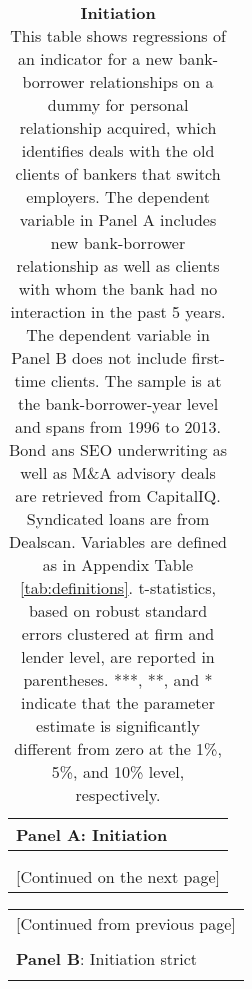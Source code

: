 \begin{table}[H] \begin{center} 
		\caption{\textbf{Initiation} \\ This table shows regressions of an indicator for a new bank-borrower relationships  on a dummy for personal relationship acquired, which identifies deals with the old clients of bankers that switch employers. The dependent variable in Panel A includes new bank-borrower relationship as well as clients with whom the bank had no interaction in the past 5 years. The dependent variable in Panel B does not include first-time clients. The sample is at the bank-borrower-year level and spans from 1996 to 2013. Bond ans SEO underwriting as well as M\&A advisory deals are retrieved from CapitalIQ. Syndicated loans are from Dealscan. Variables are defined as in Appendix Table \ref{tab:definitions}. t-statistics, based on robust standard errors clustered at firm and lender level, are reported in parentheses. ***, **, and * indicate that the parameter estimate is significantly different from zero at the 1\%, 5\%, and 10\% level, respectively. } %
		\label{tab:main_init} 
	\begin{threeparttable} 
		\begin{tabular*}{\hsize}{@{\hskip\tabcolsep\extracolsep\fill}l*{5}{c}}
			\multicolumn{5}{l}{\textbf{Panel A}: Initiation} \\
			\toprule  
				\def\sym#1{\ifmmode^{#1}\else\(^{#1}\)\fi}
				  \\
			\bottomrule \\  \multicolumn{6}{c}{[Continued on the next page]}  \end{tabular*}
			\end{threeparttable}   \end{center} \end{table}
\newpage
		\begin{table}[H] \begin{center} 
		\begin{threeparttable} 
		\begin{tabular*}{\hsize}{@{\hskip\tabcolsep\extracolsep\fill}l*{5}{c}}
			 \multicolumn{6}{c}{[Continued from previous page]} \\ \\
			 \multicolumn{5}{l}{\textbf{Panel B}: Initiation strict} \\
			\toprule  
				\def\sym#1{\ifmmode^{#1}\else\(^{#1}\)\fi}
				 
			\bottomrule \end{tabular*}
	\end{threeparttable} \end{center}
\end{table}
\clearpage \newpage

